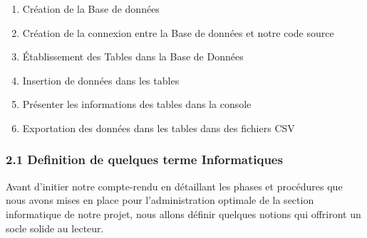 \documentclass[
]{article}
\providecommand{\tightlist}{%
  \setlength{\itemsep}{0pt}\setlength{\parskip}{0pt}}
\begin{document}
\begin{enumerate}
\def\labelenumi{\arabic{enumi}.}
\tightlist
\item
  Création de la Base de données
\item
  Création de la connexion entre la Base de données et notre code source
\item
  Établissement des Tables dans la Base de Données
\item
  Insertion de données dans les tables
\item
  Présenter les informations des tables dans la console
\item
  Exportation des données dans les tables dans des fichiers CSV
\end{enumerate}

\subsubsection{2.1 Definition de quelques terme
Informatiques}\label{definition-de-quelques-terme-informatiques}

Avant d'initier notre compte-rendu en détaillant les phases et
procédures que nous avons mises en place pour l'administration optimale
de la section informatique de notre projet, nous allons définir quelques
notions qui offriront un socle solide au lecteur.
\end{document}
